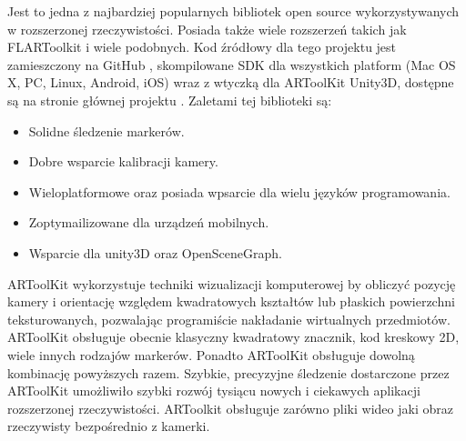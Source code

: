 Jest to jedna z najbardziej popularnych bibliotek open source wykorzystywanych w rozszerzonej rzeczywistości. Posiada także wiele rozszerzeń takich jak FLARToolkit i wiele podobnych. Kod źródłowy dla tego projektu jest zamieszczony na GitHub \cite{ARToolkit}, skompilowane SDK dla wszystkich platform (Mac OS X, PC, Linux, Android, iOS) wraz z wtyczką dla ARToolKit Unity3D, dostępne są na stronie głównej projektu \cite{ARToolkit}. Zaletami tej biblioteki są:
\begin{itemize}
	\item Solidne śledzenie markerów.
	\item Dobre wsparcie kalibracji kamery.
	\item Wieloplatformowe oraz posiada wpsarcie dla wielu języków programowania.
	\item Zoptymailizowane dla urządzeń mobilnych.
	\item Wsparcie dla unity3D oraz OpenSceneGraph.
\end{itemize}

ARToolKit wykorzystuje techniki wizualizacji komputerowej by obliczyć pozycję kamery i orientację względem kwadratowych kształtów lub płaskich powierzchni teksturowanych, pozwalając programiście nakładanie wirtualnych przedmiotów. ARToolKit obsługuje obecnie klasyczny kwadratowy znacznik, kod kreskowy 2D, wiele innych rodzajów markerów. Ponadto ARToolKit obsługuje dowolną kombinację powyższych razem. Szybkie, precyzyjne śledzenie dostarczone przez ARToolKit umożliwiło szybki rozwój tysiącu nowych i ciekawych aplikacji rozszerzonej rzeczywistości. ARToolkit obsługuje zarówno pliki wideo jaki obraz rzeczywisty bezpośrednio z kamerki.

